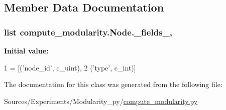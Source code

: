 \subsection{Member Data Documentation}
\hypertarget{classcompute__modularity_1_1_node_aab150ff895b8721c991a02712602effb}{
\subsubsection[{\+\_\+fields\+\_\+}]{\setlength{\rightskip}{0pt plus 5cm}list compute\+\_\+modularity.\+Node.\+\_\+fields\+\_\+\hspace{0.3cm}{\ttfamily [static]}, {\ttfamily [private]}}}\label{classcompute__modularity_1_1_node_aab150ff895b8721c991a02712602effb}
{\bfseries Initial value\+:}
\begin{DoxyCode}
1 = [(\textcolor{stringliteral}{'node\_id'}, c\_uint),
2                 (\textcolor{stringliteral}{'type'}, c\_int)]
\end{DoxyCode}


The documentation for this class was generated from the following file\+:\begin{DoxyCompactItemize}
\item 
Sources/\+Experiments/\+Modularity\+\_\+py/\hyperlink{compute__modularity_8py}{compute\+\_\+modularity.\+py}\end{DoxyCompactItemize}
